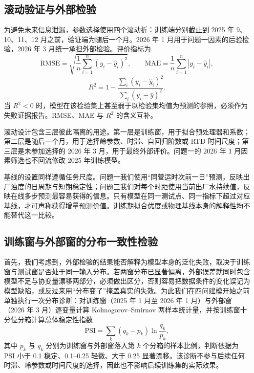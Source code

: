 \documentclass[UTF8,12pt,a4paper]{ctexart}
\newcommand{\Rtwo}{R^{2}}
\begin{document}
\subsection{滚动验证与外部检验}

为避免未来信息泄漏，参数选择使用四个滚动折：训练端分别截止到 2025 年 9、10、11、12 月之前，验证端为随后一个月。2026 年 1 月用于问题一因素的后验检验，2026 年 3 月统一承担外部检验。评价指标为
\begin{equation}
\mathrm{RMSE}=\sqrt{\frac{1}{n}\sum_{i=1}^{n}(y_i-\hat y_i)^2},\qquad
\mathrm{MAE}=\frac{1}{n}\sum_{i=1}^{n}|y_i-\hat y_i|,
\label{eq:metrics1}
\end{equation}
\begin{equation}
\Rtwo=1-\frac{\sum_i(y_i-\hat y_i)^2}{\sum_i(y_i-\bar y)^2}.
\label{eq:metrics2}
\end{equation}
当 $\Rtwo<0$ 时，模型在该检验集上甚至弱于以检验集均值为预测的参照，必须作为失败证据报告。RMSE、MAE 与 $\Rtwo$ 的含义互补。

滚动设计包含三层彼此隔离的用途。第一层是训练窗，用于拟合预处理器和系数；第二层是随后一个月，用于选择岭参数、时滞、自回归阶数或 RTD 时间尺度；第三层是未参加选择的 2026 年 3 月，用于最终外部评价。问题一的 2026 年 1 月因素筛选也不回流修改 2025 年训练模型。

基线的设置同样遵循任务尺度。问题一我们使用“同营运时次前一日”预测，反映出厂浊度的日周期与短期稳定性；问题三我们对每个时距使用当前出厂水持续值，反映在线多步预测最容易获得的信息。只有模型在同一测试点、同一指标下超过对应基线，才可声称获得增量预测价值。训练期拟合优度或物理基线本身的解释性均不能替代这一比较。
\subsection{训练窗与外部窗的分布一致性检验}
\label{sec:shift}

首先，我们考虑到，外部检验的结果能否解释为模型本身的泛化失败，取决于训练窗与测试窗是否处于同一输入分布。若两窗分布已显著偏离，外部误差就同时包含模型不足与协变量漂移两部分，必须做出区分，否则容易把数据条件的变化误记为模型缺陷，或反过来用“分布变了”掩盖真实的失效。为此我们在四问建模开始之前单独执行一次分布诊断：对训练窗（2025 年 1 月至 2026 年 1 月）与外部窗（2026 年 3 月）逐变量计算 Kolmogorov--Smirnov 两样本统计量，并按训练窗十分位分箱计算总体稳定性指数
\begin{equation}
\mathrm{PSI}=\sum_{k}\left(q_k-p_k\right)\ln\frac{q_k}{p_k},
\label{eq:psi}
\end{equation}
其中 $p_k$ 与 $q_k$ 分别为训练窗与外部窗落入第 $k$ 个分箱的样本比例，判断依据为 PSI 小于 0.1 稳定、0.1--0.25 轻微、大于 0.25 显著漂移。该诊断不参与后续任何时滞、岭参数或时间尺度的选择，因此也不影响后续训练集的实际效果。
\end{document}
